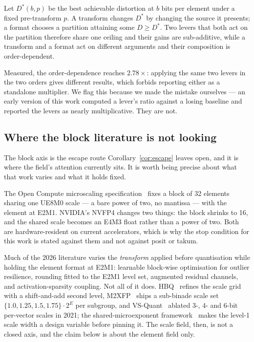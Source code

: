 \begin{theorem}
\label{thm:compose}
Let $D^{*}(b,p)$ be the best achievable distortion at $b$ bits per element under
a fixed pre-transform $p$. A transform changes $D^{*}$ by changing the source it
presents; a format chooses a partition attaining some $D \ge D^{*}$. Two levers
that both act on the partition therefore share one ceiling and their gains are
sub-additive, while a transform and a format act on different arguments and their
composition is order-dependent.
\end{theorem}

Measured, the order-dependence reaches $2.78\times$: applying the same two levers
in the two orders gives different results, which forbids reporting either as a
standalone multiplier. We flag this because we made the mistake ourselves ---
an early version of this work computed a lever's ratio against a losing baseline
and reported the levers as nearly multiplicative. They are not.


\subsection{Where the block literature is not looking}\label{sec:blockrelated}


The block axis is the escape route Corollary~\ref{cor:escape} leaves open, and it
is where the field's attention currently sits. It is worth being precise about
what that work varies and what it holds fixed.

The Open Compute microscaling specification~\cite{ocp_mx2023} fixes a block of 32 elements sharing
one UE8M0 scale --- a bare power of two, no mantissa --- with the element at E2M1.
NVIDIA's NVFP4 changes two things: the block shrinks to 16, and the shared scale
becomes an E4M3 float rather than a power of two. Both are hardware-resident on
current accelerators, which is why the stop condition for this work is stated
against them and not against posit or takum.

Much of the 2026 literature varies the \emph{transform} applied before quantisation while holding the element format at E2M1: learnable block-wise
optimisation for outlier resilience, rounding fitted to the E2M1
level set, augmented residual channels, and activation-sparsity coupling. Not all of it does. HBQ~\cite{hbq2026} refines the scale grid with a shift-and-add second level, M2XFP~\cite{m2xfp2026} ships a sub-binade scale set $\{1.0,1.25,1.5,1.75\}\cdot2^{E}$ per subgroup, and VS-Quant~\cite{vsquant2021} ablated 3-, 4- and 6-bit per-vector scales in 2021; the shared-microexponent framework~\cite{bdr2023} makes the level-1 scale width a design variable before pinning it. The scale field, then, is not a closed axis, and the claim below is about the element field only.

